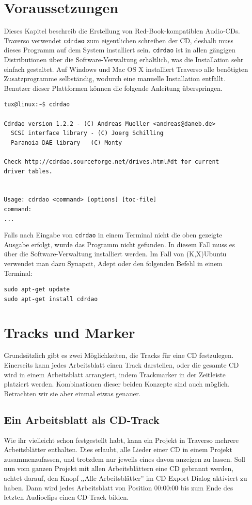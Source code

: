 \section{Voraussetzungen}
Dieses Kapitel beschreib die Erstellung von Red-Book-kompatiblen Audio-CDs. Traverso verwendet \texttt{cdrdao} zum eigentlichen schreiben der CD, deshalb muss dieses Programm auf dem System installiert sein. \texttt{cdrdao} ist in allen gängigen Distributionen über die Software-Verwaltung erhältlich, was die Installation sehr einfach gestaltet. Auf Windows und Mac OS X installiert Traverso alle benötigten Zusatzprogramme selbständig, wodurch eine manuelle Installation entfällt. Benutzer dieser Plattformen können die folgende Anleitung überspringen.

\footnotesize
\begin{verbatim}
tux@linux:~$ cdrdao

Cdrdao version 1.2.2 - (C) Andreas Mueller <andreas@daneb.de>
  SCSI interface library - (C) Joerg Schilling
  Paranoia DAE library - (C) Monty

Check http://cdrdao.sourceforge.net/drives.html#dt for current 
driver tables.


Usage: cdrdao <command> [options] [toc-file]
command:
...
\end{verbatim}
\normalsize

Falls nach Eingabe von \texttt{cdrdao} in einem Terminal nicht die oben gezeigte Ausgabe erfolgt, wurde das Programm nicht gefunden. In diesem Fall muss es über die Software-Verwaltung installiert werden. Im Fall von (K,X)Ubuntu verwendet man dazu Synapcit, Adept oder den folgenden Befehl in einem Terminal:

\begin{verbatim}
sudo apt-get update
sudo apt-get install cdrdao
\end{verbatim}

\section{Tracks und Marker}
Grundsätzlich gibt es zwei Möglichkeiten, die Tracks für eine CD festzulegen. Einerseits kann jedes Arbeitsblatt einen Track darstellen, oder die gesamte CD wird in einem Arbeitsblatt arrangiert, indem Trackmarker in der Zeitleiste platziert werden. Kombinationen dieser beiden Konzepte sind auch möglich. Betrachten wir sie aber einmal etwas genauer.

\subsection{Ein Arbeitsblatt als CD-Track}
Wie ihr vielleicht schon festgestellt habt, kann ein Projekt in Traverso mehrere Arbeitsblätter enthalten. Dies erlaubt, alle Lieder einer CD in einem Projekt zusammenzufassen, und trotzdem nur jeweils eines davon anzeigen zu lassen. Soll nun vom ganzen Projekt mit allen Arbeitsblättern eine CD gebrannt werden, achtet darauf, den Knopf ,,Alle Arbeitsblätter'' im CD-Export Dialog aktiviert zu haben. Dann wird jedes Arbeitsblatt von Position 00:00:00 bis zum Ende des letzten Audioclips einen CD-Track bilden.

